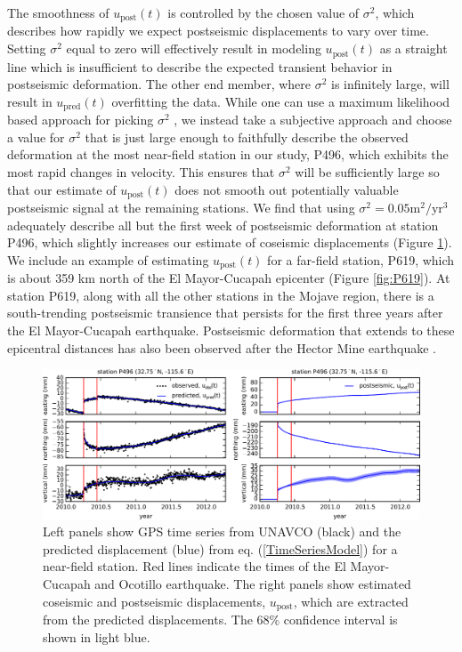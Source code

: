 \documentclass[draft,linenumbers]{AGUJournal}
\begin{document}
The smoothness of $u_\mathrm{post}(t)$ is controlled by the chosen value of $\sigma^2$, which describes how rapidly we expect postseismic displacements to vary over time.  Setting $\sigma^2$ equal to zero will effectively result in modeling $u_\mathrm{post}(t)$ as a straight line which is insufficient to describe the expected transient behavior in postseismic deformation. The other end member, where $\sigma^2$ is infinitely large, will result in $u_\mathrm{pred}(t)$ overfitting the data. While one can use a maximum likelihood based approach for picking $\sigma^2$ \citep[e.g.][]{Segall1997}, we instead take a subjective approach and choose a value for $\sigma^2$ that is just large enough to faithfully describe the observed deformation at the most near-field station in our study, P496, which exhibits the most rapid changes in velocity. This ensures that $\sigma^2$ will be sufficiently large so that our estimate of $u_\mathrm{post}(t)$ does not smooth out potentially valuable postseismic signal at the remaining stations. We find that using $\sigma^2 = 0.05 \mathrm{m}^2 / \mathrm{yr}^3$ adequately describe all but the first week of postseismic deformation at station P496, which slightly increases our estimate of coseismic displacements (Figure \ref{fig:P496}).  We include an example of estimating $u_\mathrm{post}(t)$ for a far-field station, P619, which is about 359 km north of the El Mayor-Cucapah epicenter (Figure \ref{fig:P619}).  At station P619, along with all the other stations in the Mojave region, there is a south-trending postseismic transience that persists for the first three years after the El Mayor-Cucapah earthquake.  Postseismic deformation that extends to these epicentral distances has also been observed after the Hector Mine earthquake \citep{Freed2007a}.

\begin{figure}
\includegraphics[scale=0.9]{Figures/2016jb013114-p02}
\centering
\caption{Left panels show GPS time series from UNAVCO (black) and the predicted displacement (blue) from eq. (\ref{TimeSeriesModel}) for a near-field station.  Red lines indicate the times of the El Mayor-Cucapah and Ocotillo earthquake. The right panels show estimated coseismic and postseismic displacements, $u_\mathrm{post}$, which are extracted from the predicted displacements.  The 68\% confidence interval is shown in light blue.}
\label{fig:P496}
\end{figure}
\end{document}
